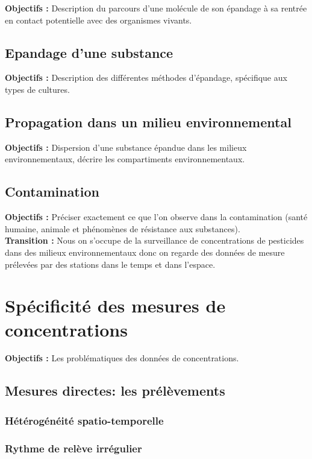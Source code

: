 \documentclass[12pt, twoside]{report}
\begin{document}
\textbf{Objectifs :} Description du parcours d'une molécule de son épandage à sa rentrée en contact potentielle avec des organismes vivants. 

\subsection{Epandage d'une substance}

\textbf{Objectifs :} Description des différentes méthodes d'épandage, spécifique aux types de cultures. 

\subsection{Propagation dans un milieu environnemental}

\textbf{Objectifs :} Dispersion d'une substance épandue dans les milieux environnementaux, décrire les compartiments environnementaux. 

\subsection{Contamination}

\textbf{Objectifs :} Préciser exactement ce que l'on observe dans la contamination (santé humaine, animale et phénomènes de résistance aux substances). \\

\textbf{Transition :} Nous on s'occupe de la surveillance de concentrations de pesticides dans des milieux environnementaux donc on regarde des données de mesure prélevées par des stations dans le temps et dans l'espace.

\section{Spécificité des mesures de concentrations}

\textbf{Objectifs :} Les problématiques des données de concentrations. 

\subsection{Mesures directes: les prélèvements}
\subsubsection{Hétérogénéité spatio-temporelle}
\subsubsection{Rythme de relève irrégulier}
\end{document}
